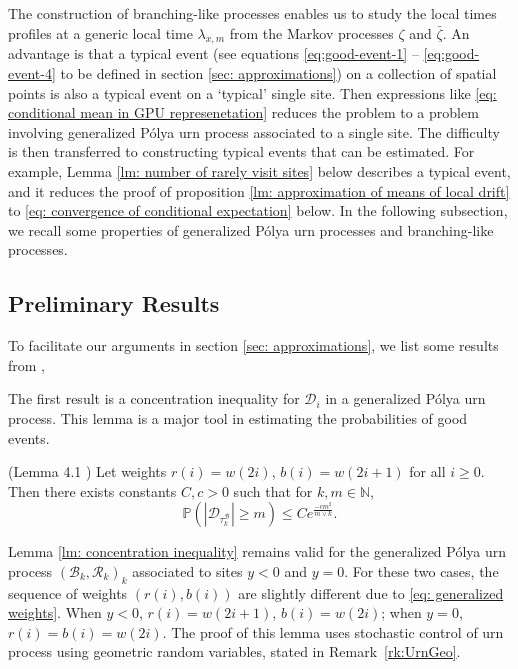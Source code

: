 \documentclass[EJP]{ejpecp} %
\newcommand{\abs}[1]{\left\vert #1 \right\vert}
\begin{document}
The construction of branching-like processes enables us to study the local times profiles at a generic local time $\lambda_{x,m}$ from the Markov processes $\zeta$ and $\bar{\zeta}$. An advantage is that a typical event ({see equations \eqref{eq:good-event-1} -- \eqref{eq:good-event-4} to be defined in section \ref{sec: approximations}}) on a collection of spatial points is also a typical event on a `typical' single site. Then expressions like \eqref{eq: conditional mean in GPU represenetation} reduces the problem to a problem involving generalized P\'{o}lya urn process associated to a single site. The difficulty is then transferred to constructing typical events that can be estimated. For example, Lemma \ref{lm: number of rarely visit sites} below describes a typical event, and it reduces the proof of proposition \ref{lm: approximation of means of local drift} to \eqref{eq: convergence of conditional expectation} below. In the following subsection, we recall some properties of generalized P\'{o}lya urn processes and branching-like processes.

\subsection{Preliminary Results}
To facilitate our arguments in section \ref{sec: approximations}, we list some results from \cite{KMP23,T96}, 

The first result is a concentration inequality for $\mathcal{D}_i$ in a generalized P\'{o}lya urn process. This lemma is a major tool in estimating the probabilities of good events.
\begin{lemma}(Lemma 4.1 \cite{KMP23})\label{lm: concentration inequality}
	Let weights $r(i) = w(2i)$, $b(i)= w(2i+1) $ for all $i\geq 0$. Then there exists constants $C,c>0$ such that for $k, m \in \mathbb{N}$,
	$$
	\mathbb{P}\left(  \abs{ \mathcal{D}_{\tau_k^{\mathcal{B}}}   } \geq m \right) \leq C e^{\frac{-cm^2}{m \vee k}}.
	$$
\end{lemma} 
Lemma \ref{lm: concentration inequality} remains valid for the generalized P\'{o}lya urn process $(\mathcal{B}_{k},\mathcal{R}_{k})_k$ associated to sites $y<0$ and $y=0$. For these two cases, the sequence of weights $(r(i),b(i))$ are slightly different due to \eqref{eq: generalized weights}. When $y<0$, $r(i) = w(2i+1)$, $b(i)= w(2i) $; when $y=0$, $r(i) = b(i)=w(2i)$. The proof of this lemma uses stochastic control of urn process using geometric random variables, stated in Remark~\ref{rk:UrnGeo}.
\end{document}
